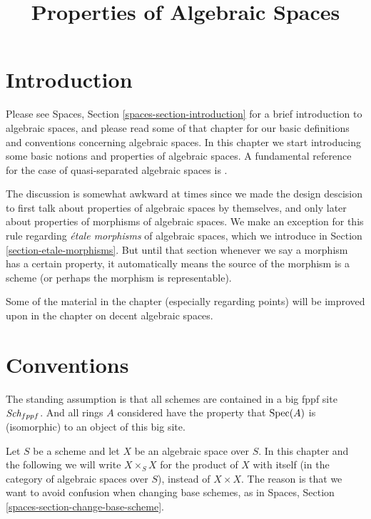 

%


\title{Properties of Algebraic Spaces}


\maketitle

\label{section-phantom}

\tableofcontents

\section{Introduction}
\label{section-introduction}

\noindent
Please see
Spaces, Section \ref{spaces-section-introduction}
for a brief introduction to algebraic spaces, and please read
some of that chapter for our basic definitions and conventions
concerning algebraic spaces. In this chapter we start introducing
some basic notions and properties of algebraic spaces. A fundamental
reference for the case of quasi-separated algebraic spaces is
\cite{Kn}.

\medskip\noindent
The discussion is somewhat awkward at times since we made the design
descision to first talk about properties of algebraic spaces by
themselves, and only later about properties of morphisms of algebraic
spaces. We make an exception for this rule regarding
{\it \'etale morphisms} of algebraic spaces, which we introduce in
Section \ref{section-etale-morphisms}.
But until that section whenever we say a morphism has a certain property, it
automatically means the source of the morphism is a scheme (or perhaps the
morphism is representable).

\medskip\noindent
Some of the material in the chapter (especially regarding points)
will be improved upon in the chapter on decent algebraic spaces.


\section{Conventions}
\label{section-conventions}

\noindent
The standing assumption is that all schemes are contained in
a big fppf site $\textit{Sch}_{fppf}$. And all rings $A$ considered
have the property that $\mathop{\rm Spec}(A)$ is (isomorphic) to an
object of this big site.

\medskip\noindent
Let $S$ be a scheme and let $X$ be an algebraic space over $S$.
In this chapter and the following we will write $X \times_S X$
for the product of $X$ with itself (in the category of algebraic
spaces over $S$), instead of $X \times X$. The reason is that we
want to avoid confusion when changing base schemes, as in
Spaces, Section \ref{spaces-section-change-base-scheme}.


